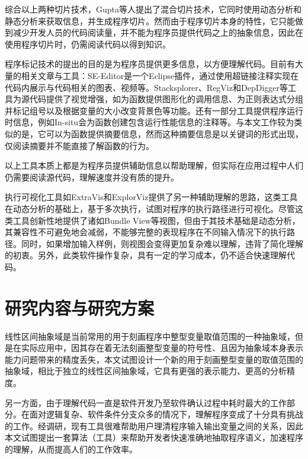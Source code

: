  综合以上两种切片技术，Gupta\cite{gupta1997hybrid}等人提出了混合切片技术，它同时使用动态分析和静态分析来获取信息，并生成程序切片。然而由于程序切片本身的特性，它只能做到减少开发人员的代码阅读量，并不能为程序员提供代码之上的抽象信息，因此在使用程序切片时，仍需阅读代码以得到知识。 
 
 程序标记技术的提出的目的是为程序员提供更多信息，以方便理解代码。目前有大量的相关文章与工具：SE-Editor\cite{schugerl2009beyond}是一个Eclipse插件，通过使用超链接注释实现在代码内展示与代码相关的图表、视频等。Stacksplorer\cite{karrer2011stacksplorer}、RegViz\cite{beck2014regviz}和DepDigger\cite{beyer2010depdigger}等工具为源代码提供了视觉增强，如为函数提供图形化的调用信息、为正则表达式分组并标记组号以及根据变量的大小改变背景色等功能。还有一部分工具提供程序运行时信息，例如In-situ\cite{beck2013situ}会为函数创建包含运行性能信息的注释等。与本文工作较为类似的是\cite{haiduc2010supporting}，它可以为函数提供摘要信息，然而这种摘要信息是以关键词的形式出现，仅阅读摘要并不能直接了解函数的行为。
 
 以上工具本质上都是为程序员提供辅助信息以帮助理解，但实际在应用过程中人们仍需要阅读源代码，理解速度并没有质的提升。 
 
 执行可视化工具如ExtraVis\cite{cornelissen2007understanding}和ExplorViz\cite{fittkau2013live}提供了另一种辅助理解的思路，这类工具在动态分析的基础上，基于多次执行，试图对程序的执行路径进行可视化。尽管这类工具创新性地提供了诸如Bundle View等视图，但由于其技术基础是动态分析，其兼容性不可避免地会减弱，不能够完整的表现程序在不同输入情况下的执行路径。同时，如果增加输入样例，则视图会变得更加复杂难以理解，违背了简化理解的初衷。另外，此类软件操作复杂，具有一定的学习成本，仍不适合快速理解代码。
 
 \section{研究内容与研究方案}
  
线性区间抽象域是当前常用的用于刻画程序中整型变量取值范围的一种抽象域，但是在实际应用中，因其存在着无法刻画整型变量的符号性、且因为抽象域本身表示能力问题带来的精度丢失，本文试图设计一个新的用于刻画整型变量的取值范围的抽象域，相比于独立的线性区间抽象域，它具有更强的表示能力、更高的分析精度。

另一方面，由于理解代码一直是软件开发乃至软件确认过程中耗时最大的工作部分。在面对逻辑复杂、软件条件分支众多的情况下，理解程序变成了十分具有挑战的工作。经调研，现有工具很难帮助用户理清程序输入输出变量之间的关系，因此本文试图提出一套算法（工具）来帮助开发者快速准确地抽取程序语义，加速程序的理解，从而提高人们的工作效率。

